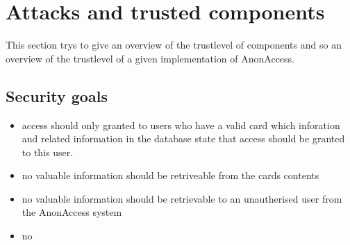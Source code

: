 \section{Attacks and trusted components}
This section trys to give an overview of the trustlevel of components and so an overview of the trustlevel of a given implementation of AnonAccess.

\subsection{Security goals}
\begin{itemize}
 \item access should only granted to users who have a valid card which inforation and related information in the database state that access should be granted to this user.
 \item no valuable information should be retriveable from the cards contents
 \item no valuable information should be retrievable to an unautherised user from the AnonAccess system
 \item no 
\end{itemize}